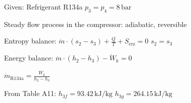Given: Refrigerant R134a  
\( p_3 = p_4 = 8 \, \text{bar} \)  

Steady flow process in the compressor: adiabatic, reversible  

Entropy balance:  
\( \dot{m} \cdot (s_2 - s_3) + \frac{Q}{T} + S_{\text{erz}} = 0 \)  
\( s_2 = s_3 \)  

Energy balance:  
\( \dot{m} \cdot (h_2 - h_3) - \dot{W}_k = 0 \)  

\( \dot{m}_{\text{R134a}} = \frac{\dot{W}_k}{h_2 - h_3} \)  

From Table A11:  
\( h_{3f} = 93.42 \, \text{kJ/kg} \)  
\( h_{3g} = 264.15 \, \text{kJ/kg} \)